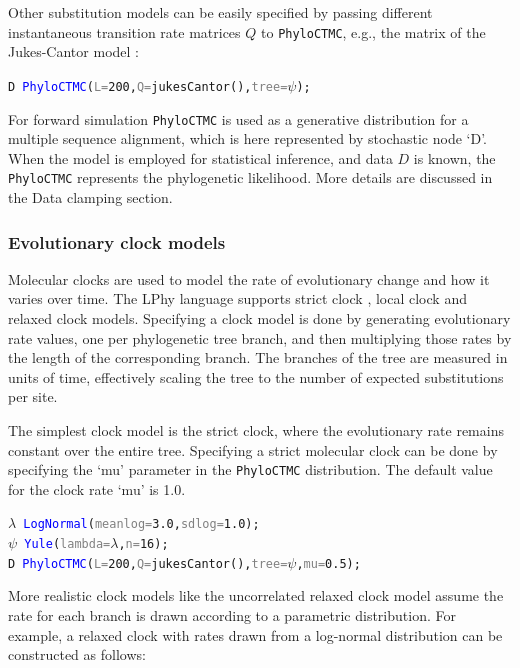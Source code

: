 \documentclass[10pt,letterpaper,table]{article}
\theoremstyle{definition}
\begin{document}
Other substitution models can be easily specified by passing different instantaneous transition rate matrices $Q$ to \texttt{PhyloCTMC}, e.g., the matrix of the Jukes-Cantor model \cite{jc69}:
{
  \small
  \begin{listing}
    \begin{alltt}
    \textcolor{bluishgreen}{D} ~ \textcolor{blue}{PhyloCTMC}(\textcolor{gray}{L=}\textcolor{constant}{200}, \textcolor{gray}{Q=}\textcolor{generator}{jukesCantor}(), \textcolor{gray}{tree=}\textcolor{bluishgreen}{\(\psi\)});
    \end{alltt}
  \end{listing}
}

For forward simulation \texttt{PhyloCTMC} is used as a generative distribution for a multiple sequence alignment, which is here represented by stochastic node `D'. When the model is employed for statistical inference, and data $D$ is known, the \texttt{PhyloCTMC} represents the phylogenetic likelihood. 
More details are discussed in the Data clamping section.

\subsubsection{Evolutionary clock models}
\label{sec:clockmodels}

Molecular clocks are used to model the rate of evolutionary change and how it varies over time. 
The LPhy language supports strict clock \cite{zuckerkandl1965evolutionary, zuckerkandl1965molecules}, local clock \cite{drummond2010bayesian} and relaxed clock \cite{drummond2006relaxedconfidence} models. 
Specifying a clock model is done by generating evolutionary rate values, one per phylogenetic tree branch, and then multiplying those rates by the length of the corresponding branch. 
The branches of the tree are measured in units of time, effectively scaling the tree to the number of expected substitutions per site. 

The simplest clock model is the strict clock, where the evolutionary rate remains constant over the entire tree. 
Specifying a strict molecular clock can be done by specifying the `mu' parameter in the \texttt{PhyloCTMC} distribution.
The default value for the clock rate `mu' is 1.0.
{\small
\begin{alltt}
    \textcolor{bluishgreen}{\(\lambda\)} ~ \textcolor{blue}{LogNormal}(\textcolor{gray}{meanlog=}\textcolor{constant}{3.0}, \textcolor{gray}{sdlog=}\textcolor{constant}{1.0});
    \textcolor{bluishgreen}{\(\psi\)} ~ \textcolor{blue}{Yule}(\textcolor{gray}{lambda=}\textcolor{bluishgreen}{\(\lambda\)}, \textcolor{gray}{n=}\textcolor{constant}{16});
    \textcolor{bluishgreen}{D} ~ \textcolor{blue}{PhyloCTMC}(\textcolor{gray}{L=}\textcolor{constant}{200}, \textcolor{gray}{Q=}\textcolor{generator}{jukesCantor}(), \textcolor{gray}{tree=}\textcolor{bluishgreen}{\(\psi\)}, \textcolor{gray}{mu=}\textcolor{constant}{0.5});
\end{alltt}
}
More realistic clock models like the uncorrelated relaxed clock model \cite{drummond2006relaxedconfidence} assume the rate for each branch is drawn according to a parametric distribution. 
For example, a relaxed clock with rates drawn from a log-normal distribution can be constructed as follows:
\end{document}
